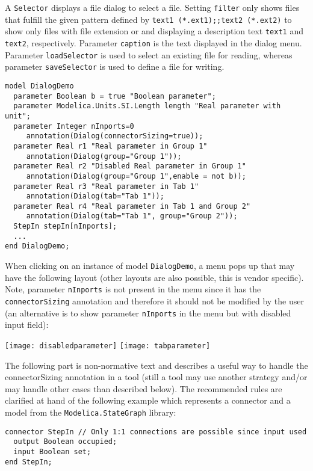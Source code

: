 A \lstinline!Selector! displays a file dialog to select a file. Setting \lstinline!filter! only
shows files that fulfill the given pattern defined by \lstinline!text1 (*.ext1);;text2 (*.ext2)! to show only files with file extension
 or  and displaying a description text \lstinline!text1! and
\lstinline!text2!, respectively. Parameter \lstinline!caption! is the text displayed in the
dialog menu. Parameter \lstinline!loadSelector! is used to select an existing file
for reading, whereas parameter \lstinline!saveSelector! is used to define a file for
writing.

\begin{example}
\begin{lstlisting}[language=modelica]
model DialogDemo
  parameter Boolean b = true "Boolean parameter";
  parameter Modelica.Units.SI.Length length "Real parameter with unit";
  parameter Integer nInports=0
     annotation(Dialog(connectorSizing=true));
  parameter Real r1 "Real parameter in Group 1"
     annotation(Dialog(group="Group 1"));
  parameter Real r2 "Disabled Real parameter in Group 1"
     annotation(Dialog(group="Group 1",enable = not b));
  parameter Real r3 "Real parameter in Tab 1"
     annotation(Dialog(tab="Tab 1"));
  parameter Real r4 "Real parameter in Tab 1 and Group 2"
     annotation(Dialog(tab="Tab 1", group="Group 2"));
  StepIn stepIn[nInports];
  ...
end DialogDemo;
\end{lstlisting}
When clicking on an instance of model \lstinline!DialogDemo!, a menu pops up
that may have the following layout (other layouts are also possible,
this is vendor specific). Note, parameter \lstinline!nInports! is not present in the
menu since it has the \lstinline!connectorSizing! annotation and therefore it
should not be modified by the user (an alternative is to show parameter
\lstinline!nInports! in the menu but with disabled input field):

\texttt{[image: disabledparameter]}
\texttt{[image: tabparameter]}

The following part is non-normative text and describes a useful
way to handle the connectorSizing annotation in a tool (still a tool may
use another strategy and/or may handle other cases than described
below). The recommended rules are clarified at hand of the following
example which represents a connector and a model from the
\lstinline!Modelica.StateGraph! library:
\begin{lstlisting}[language=modelica]
connector StepIn // Only 1:1 connections are possible since input used
  output Boolean occupied;
  input Boolean set;
end StepIn;


\end{lstlisting}
\end{example}
